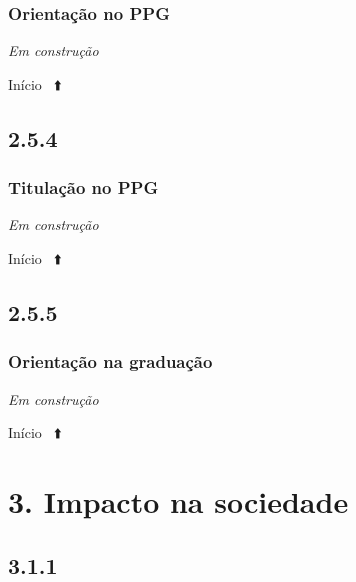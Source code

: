 \documentclass[
  a4paper,
]{book}
\begin{document}
\hypertarget{orientauxe7uxe3o-no-ppg}{%
\subsubsection{\texorpdfstring{\textbf{Orientação no PPG}}{Orientação no PPG}}\label{orientauxe7uxe3o-no-ppg}}

\emph{Em construção}

Início ~⬆️

\hypertarget{section-21}{%
\subsection{\texorpdfstring{\textbf{2.5.4}}{2.5.4}}\label{section-21}}

\hypertarget{titulauxe7uxe3o-no-ppg}{%
\subsubsection{\texorpdfstring{\textbf{Titulação no PPG}}{Titulação no PPG}}\label{titulauxe7uxe3o-no-ppg}}

\emph{Em construção}

Início ~⬆️

\hypertarget{section-22}{%
\subsection{\texorpdfstring{\textbf{2.5.5}}{2.5.5}}\label{section-22}}

\hypertarget{orientauxe7uxe3o-na-graduauxe7uxe3o}{%
\subsubsection{\texorpdfstring{\textbf{Orientação na graduação}}{Orientação na graduação}}\label{orientauxe7uxe3o-na-graduauxe7uxe3o}}

\emph{Em construção}

Início ~⬆️

\newpage

\hypertarget{impacto}{%
\section{\texorpdfstring{\textbf{3. Impacto na sociedade}}{3. Impacto na sociedade}}\label{impacto}}

\hypertarget{section-23}{%
\subsection{\texorpdfstring{\textbf{3.1.1}}{3.1.1}}\label{section-23}}
\end{document}

